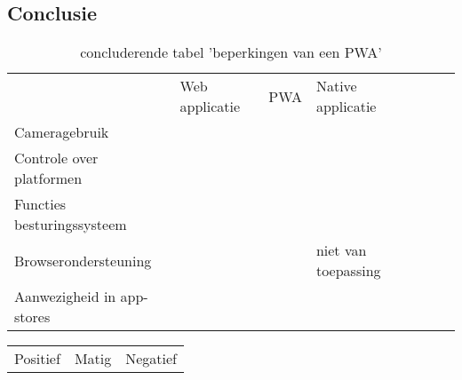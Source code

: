 	
\subsection{Conclusie}
	\begin{table}[H]
		\centering
		\begin{tabular}{lp{35mm}lp{35mm}lp{35mm}l}
			                         			  & Web applicatie 	 				 & PWA								 & Native applicatie \\
			Cameragebruik                  & \cellcolor{red!50}      		 & \cellcolor{red!50}			& \cellcolor{green!40}\\
			Controle over platformen   	& \cellcolor{red!50}      	  & \cellcolor{red!50}		& \cellcolor{green!40}\\
			Functies besturingssysteem  & \cellcolor{red!50}      		 & \cellcolor{orange!50}		& \cellcolor{green!40}\\
			Browserondersteuning		 & \cellcolor{green!40}     		& \cellcolor{orange!50}		   &niet van toepassing\\
			Aanwezigheid in app-stores	 & \cellcolor{red!50}      		    & \cellcolor{red!50}			& \cellcolor{green!40}\\
		
		\end{tabular}
		\caption{concluderende tabel 'beperkingen van een PWA'}
	\end{table}
	
	\begin{table}[H]
		\centering
		\begin{tabular}{lll}
			Positief \cellcolor{green!40} & Matig \cellcolor{orange!50} & Negatief  \cellcolor{red!50}
		\end{tabular}
	\end{table}